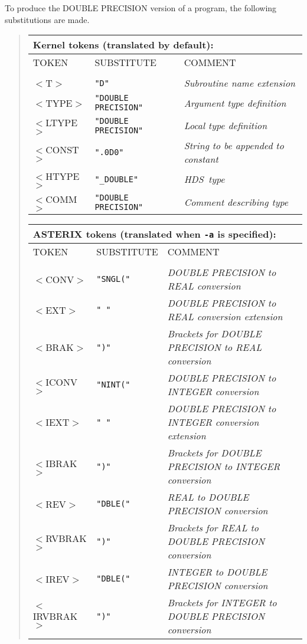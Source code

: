 \documentclass[twoside,11pt,nolof]{starlink}
\providecommand{\HDS}{{\footnotesize HDS}\normalsize}
\begin{document}
To produce the DOUBLE PRECISION version of a program, the following
substitutions are made.
\begin{quote}
\begin{tabular}{lll}
\multicolumn{3}{l}{\bf{Kernel} tokens (translated by default):} \\
\hline
TOKEN     &SUBSTITUTE  &COMMENT \\
\\
$<$T$>$     &\texttt{"D"}               &\emph{Subroutine name extension}\\
$<$TYPE$>$  &\texttt{"DOUBLE PRECISION"}&\emph{Argument type definition}\\
$<$LTYPE$>$ &\texttt{"DOUBLE PRECISION"}&\emph{Local type definition}\\
$<$CONST$>$ &\texttt{".0D0"}            &\emph{String to be appended to constant} \\
$<$HTYPE$>$ &\texttt{"\_DOUBLE"}        &\emph{\HDS\ type}\\
$<$COMM$>$  &\texttt{"DOUBLE PRECISION"}&\emph{Comment describing type}\\
\end{tabular}

\begin{tabular}{lll}
\multicolumn{3}{l}{\bf{ASTERIX} tokens (translated when \texttt{-a} is specified):}\\
\hline
TOKEN  &SUBSTITUTE  &COMMENT \\
\\
$<$CONV$>$ &\texttt{"SNGL("} &\emph{DOUBLE PRECISION to REAL conversion}\\
$<$EXT$>$  &\texttt{" "}     &\emph{DOUBLE PRECISION to REAL conversion extension}\\
$<$BRAK$>$ &\texttt{")"}     &\emph{Brackets for DOUBLE PRECISION to REAL conversion}\\
$<$ICONV$>$ &\texttt{"NINT("} &\emph{DOUBLE PRECISION to INTEGER conversion}\\
$<$IEXT$>$  &\texttt{" "}   &\emph{DOUBLE PRECISION to INTEGER conversion extension}\\
$<$IBRAK$>$ &\texttt{")"} &\emph{Brackets for DOUBLE PRECISION to INTEGER conversion}\\
$<$REV$>$   &\texttt{"DBLE("} &\emph{REAL to DOUBLE PRECISION conversion}\\
$<$RVBRAK$>$ &\texttt{")"}    &\emph{Brackets for REAL to DOUBLE PRECISION conversion}\\
$<$IREV$>$  &\texttt{"DBLE("} &\emph{INTEGER to DOUBLE PRECISION conversion}\\
$<$IRVBRAK$>$ &\texttt{")"} &\emph{Brackets for INTEGER to DOUBLE PRECISION conversion}\\
\end{tabular}
\end{quote}
\end{document}
